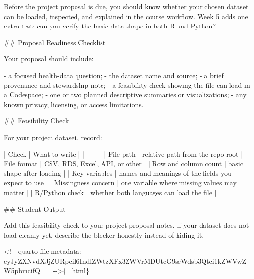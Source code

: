 \documentclass[
  letterpaper,
  DIV=11,
  numbers=noendperiod,
  oneside]{scrreprt}
\newenvironment{Shaded}{\begin{snugshade}}{\end{snugshade}}
\newcommand{\FunctionTok}[1]{\textcolor[rgb]{0.28,0.35,0.67}{#1}}
\newcommand{\InformationTok}[1]{\textcolor[rgb]{0.37,0.37,0.37}{#1}}
\newcommand{\NormalTok}[1]{\textcolor[rgb]{0.00,0.23,0.31}{#1}}
\newcommand{\PreprocessorTok}[1]{\textcolor[rgb]{0.68,0.00,0.00}{#1}}
\newcommand{\SpecialStringTok}[1]{\textcolor[rgb]{0.13,0.47,0.30}{#1}}
\begin{document}
\begin{Shaded}
\begin{Highlighting}[numbers=left,,]
\NormalTok{Before the project proposal is due, you should know whether your chosen dataset can be loaded, inspected, and explained in the course workflow. Week 5 adds one extra test: can you verify the basic data shape in both R and Python?}

\FunctionTok{\#\# Proposal Readiness Checklist}

\NormalTok{Your proposal should include:}

\SpecialStringTok{{-} }\NormalTok{a focused health{-}data question;}
\SpecialStringTok{{-} }\NormalTok{the dataset name and source;}
\SpecialStringTok{{-} }\NormalTok{a brief provenance and stewardship note;}
\SpecialStringTok{{-} }\NormalTok{a feasibility check showing the file can load in a Codespace;}
\SpecialStringTok{{-} }\NormalTok{one or two planned descriptive summaries or visualizations;}
\SpecialStringTok{{-} }\NormalTok{any known privacy, licensing, or access limitations.}

\FunctionTok{\#\# Feasibility Check}

\NormalTok{For your project dataset, record:}

\PreprocessorTok{|}\NormalTok{ Check }\PreprocessorTok{|}\NormalTok{ What to write }\PreprocessorTok{|}
\PreprocessorTok{|{-}{-}{-}|{-}{-}{-}|}
\PreprocessorTok{|}\NormalTok{ File path }\PreprocessorTok{|}\NormalTok{ relative path from the repo root }\PreprocessorTok{|}
\PreprocessorTok{|}\NormalTok{ File format }\PreprocessorTok{|}\NormalTok{ CSV, RDS, Excel, API, or other }\PreprocessorTok{|}
\PreprocessorTok{|}\NormalTok{ Row and column count }\PreprocessorTok{|}\NormalTok{ basic shape after loading }\PreprocessorTok{|}
\PreprocessorTok{|}\NormalTok{ Key variables }\PreprocessorTok{|}\NormalTok{ names and meanings of the fields you expect to use }\PreprocessorTok{|}
\PreprocessorTok{|}\NormalTok{ Missingness concern }\PreprocessorTok{|}\NormalTok{ one variable where missing values may matter }\PreprocessorTok{|}
\PreprocessorTok{|}\NormalTok{ R/Python check }\PreprocessorTok{|}\NormalTok{ whether both languages can load the file }\PreprocessorTok{|}

\FunctionTok{\#\# Student Output}

\NormalTok{Add this feasibility check to your project proposal notes. If your dataset does not load cleanly yet, describe the blocker honestly instead of hiding it.}


\InformationTok{\textasciigrave{}\textless{}!{-}{-} quarto{-}file{-}metadata: eyJyZXNvdXJjZURpciI6IndlZWtzXFx3ZWVrMDUtcG9seWdsb3Qtci1kZWVwZW5pbmcifQ== {-}{-}\textgreater{}\textasciigrave{}}\NormalTok{\{=html\}}


\end{Highlighting}
\end{Shaded}
\end{document}
